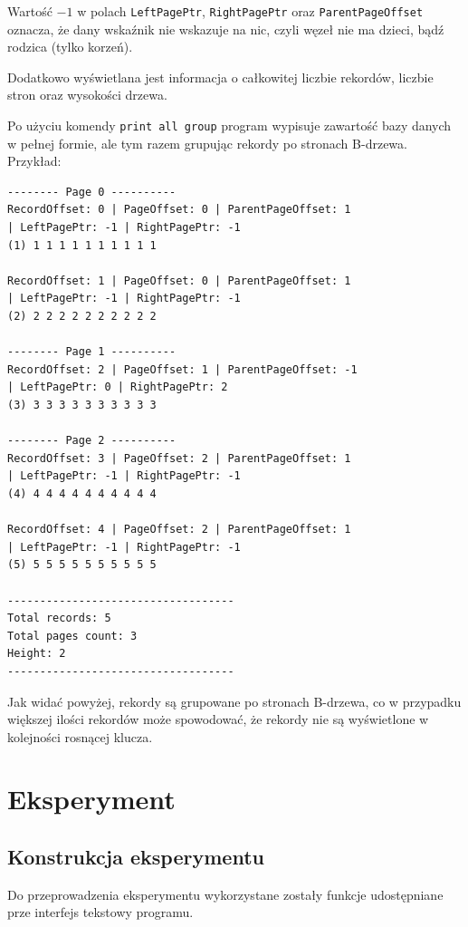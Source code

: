 \documentclass[12pt]{article}
\begin{document}
Wartość \(-1\) w polach \verb!LeftPagePtr!, \verb!RightPagePtr! oraz \verb!ParentPageOffset! oznacza, 
że dany wskaźnik nie wskazuje na nic, czyli węzeł nie ma dzieci, bądź rodzica (tylko korzeń).

Dodatkowo wyświetlana jest informacja o całkowitej liczbie rekordów, 
liczbie stron oraz wysokości drzewa.


Po użyciu komendy \verb!print all group! program wypisuje zawartość bazy danych w pełnej formie, 
ale tym razem grupując rekordy po stronach B-drzewa. Przykład:
\begin{tcolorbox}[colframe=black!75, colback=white!95, title=Output komendy \texttt{print all group}]
\begin{verbatim}
-------- Page 0 ----------
RecordOffset: 0 | PageOffset: 0 | ParentPageOffset: 1 
| LeftPagePtr: -1 | RightPagePtr: -1
(1) 1 1 1 1 1 1 1 1 1 1 

RecordOffset: 1 | PageOffset: 0 | ParentPageOffset: 1 
| LeftPagePtr: -1 | RightPagePtr: -1
(2) 2 2 2 2 2 2 2 2 2 2 

-------- Page 1 ----------
RecordOffset: 2 | PageOffset: 1 | ParentPageOffset: -1 
| LeftPagePtr: 0 | RightPagePtr: 2
(3) 3 3 3 3 3 3 3 3 3 3 

-------- Page 2 ----------
RecordOffset: 3 | PageOffset: 2 | ParentPageOffset: 1 
| LeftPagePtr: -1 | RightPagePtr: -1
(4) 4 4 4 4 4 4 4 4 4 4 

RecordOffset: 4 | PageOffset: 2 | ParentPageOffset: 1 
| LeftPagePtr: -1 | RightPagePtr: -1
(5) 5 5 5 5 5 5 5 5 5 5 

-----------------------------------
Total records: 5
Total pages count: 3
Height: 2
-----------------------------------
\end{verbatim}
\end{tcolorbox}

Jak widać powyżej, rekordy są grupowane po stronach B-drzewa, co w przypadku większej ilości rekordów może spowodować,
że rekordy nie są wyświetlone w kolejności rosnącej klucza.

\section{Eksperyment}
\subsection{Konstrukcja eksperymentu}
Do przeprowadzenia eksperymentu wykorzystane zostały funkcje udostępniane prze interfejs
tekstowy programu.
\end{document}
